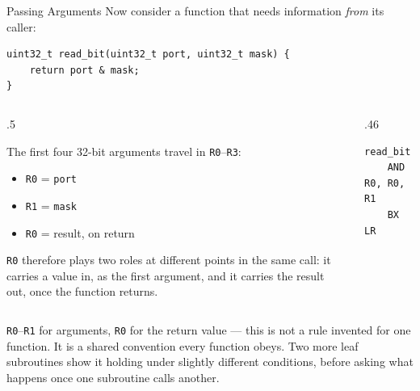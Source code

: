 \documentclass[9pt,aspectratio=169,xcolor=table]{beamer}
\begin{document}
\begin{frame}[fragile]{Passing Arguments}
	\leavevmode
	{\small Now consider a function that needs information \emph{from} its
	caller:}

	\begin{lstlisting}[style=myc]
uint32_t read_bit(uint32_t port, uint32_t mask) {
    return port & mask;
}
	\end{lstlisting}

	\vspace{2mm}
	\begin{columns}[T]
		\begin{column}{.5\textwidth}
			{\small The first four 32-bit arguments travel in \texttt{R0}--\texttt{R3}:
			\begin{itemize}\itemsep1pt
				\item \texttt{R0} = \texttt{port}
				\item \texttt{R1} = \texttt{mask}
				\item \texttt{R0} = result, on return
			\end{itemize}

			\vspace{1mm}
			\texttt{R0} therefore plays two roles at different points in the
			same call: it carries a value \alert{in}, as the first argument,
			and it carries the result \alert{out}, once the function
			returns.}
		\end{column}
		\begin{column}{.46\textwidth}
			\begin{lstlisting}[style=armasm, language=ARM, basicstyle=\small\ttfamily]
read_bit
    AND   R0, R0, R1
    BX    LR
			\end{lstlisting}
		\end{column}
	\end{columns}

	\vspace{2mm}
	{\small \texttt{R0}--\texttt{R1} for arguments, \texttt{R0} for the return
	value --- this is not a rule invented for one function. It is a shared
	convention every function obeys. Two more leaf subroutines show it holding
	under slightly different conditions, before asking what happens once one
	subroutine calls another.}
\end{frame}
\end{document}
